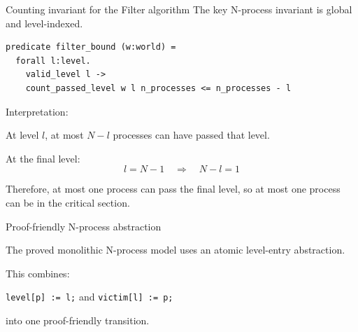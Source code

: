 \documentclass[aspectratio=169,10pt]{beamer}
\begin{document}
\begin{frame}[fragile]{Counting invariant for the Filter algorithm}
The key N-process invariant is global and level-indexed.

\begin{lstlisting}[language=why3]
predicate filter_bound (w:world) =
  forall l:level.
    valid_level l ->
    count_passed_level w l n_processes <= n_processes - l
\end{lstlisting}

\vspace{0.2cm}
Interpretation:
\begin{center}
\large At level $l$, at most $N-l$ processes can have passed that level.
\end{center}

\vspace{0.2cm}
At the final level:
\[
  l = N-1 \quad \Rightarrow \quad N-l = 1
\]

Therefore, at most one process can pass the final level, so at most one process can be in the critical section.
\end{frame}

\begin{frame}{Proof-friendly N-process abstraction}

The proved monolithic N-process model uses an atomic level-entry abstraction.

\vspace{0.2cm}
\begin{center}
\end{center}

\vspace{0.2cm}
This combines:
\begin{center}
\texttt{level[p] := l;} \qquad and \qquad \texttt{victim[l] := p;}
\end{center}

into one proof-friendly transition.
\end{frame}
\end{document}
